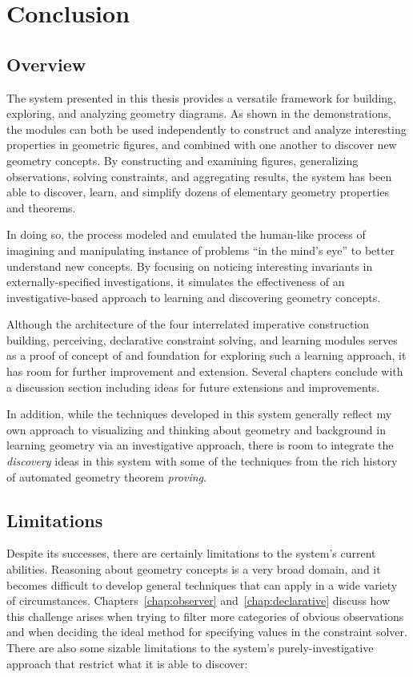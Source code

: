 \chapter{Conclusion}
\label{chap:conclusion}

\section{Overview}

The system presented in this thesis provides a versatile framework for
building, exploring, and analyzing geometry diagrams. As shown in the
demonstrations, the modules can both be used independently to
construct and analyze interesting properties in geometric figures, and
combined with one another to discover new geometry concepts. By
constructing and examining figures, generalizing observations, solving
constraints, and aggregating results, the system has been able to
discover, learn, and simplify dozens of elementary geometry properties
and theorems.

In doing so, the process modeled and emulated the human-like process
of imagining and manipulating instance of problems ``in the mind's
eye'' to better understand new concepts. By focusing on noticing
interesting invariants in externally-specified investigations, it
simulates the effectiveness of an investigative-based approach to
learning and discovering geometry concepts.

Although the architecture of the four interrelated imperative
construction building, perceiving, declarative constraint solving, and
learning modules serves as a proof of concept of and foundation for
exploring such a learning approach, it has room for further
improvement and extension. Several chapters conclude with a discussion
section including ideas for future extensions and improvements.

In addition, while the techniques developed in this system generally
reflect my own approach to visualizing and thinking about geometry and
background in learning geometry via an investigative approach, there
is room to integrate the \emph{discovery} ideas in this system with
some of the techniques from the rich history of automated geometry
theorem \emph{proving}.

\section{Limitations}

Despite its successes, there are certainly limitations to the system's
current abilities. Reasoning about geometry concepts is a very broad
domain, and it becomes difficult to develop general techniques that
can apply in a wide variety of circumstances.
Chapters~\ref{chap:observer} and~\ref{chap:declarative} discuss how
this challenge arises when trying to filter more categories of obvious
observations and when deciding the ideal method for specifying values
in the constraint solver.  There are also some sizable limitations to
the system's purely-investigative approach that restrict what it is
able to discover:

